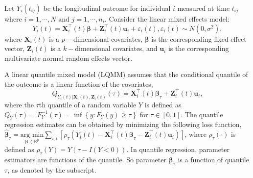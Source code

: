 \documentclass[Crown, sagev, times, doublespace]{sagej}
\begin{document}
Let $Y_{i}(t_{ij})$ be the longitudinal outcome for individual $i$ measured at time $t_{ij}$ where $i=1, \cdots, N\mbox{ and } j=1,\cdots, n_i$. Consider the linear mixed effects model:
\begin{equation}\label{eqn:lmm}
Y_{i}(t) ={\boldsymbol X}_{i}^{\top}(t) \boldsymbol{\beta}+ {\boldsymbol Z}_{i}^{\top}(t)\boldsymbol{u}_i + \varepsilon_{i}(t), \varepsilon_{i}(t)\sim N(0, \sigma^{2}),
\end{equation}
where ${\boldsymbol X}_{i}(t)$ is a $p-$dimensional covariates, $\boldsymbol{\beta}$ is the corresponding fixed effect vector, ${\boldsymbol Z}_{i}(t)$ is a $k-$dimensional covariates, and $\boldsymbol{u}_i$ is the corresponding multivariate normal random effects vector.

A linear quantile mixed model (LQMM) assumes that the conditional quantile of the outcome is a linear function of the covariates,
\begin{equation}\label{eqn:lqmm}
Q_{Y_{i}(t)|{\boldsymbol X}_{i}(t),{\boldsymbol Z}_{i}(t)}(\tau)={\boldsymbol X}_{i}^{\top}(t) \boldsymbol{\beta}_{\tau}+ {\boldsymbol Z}_{i}^{\top}(t)\boldsymbol{u}_i,
\end{equation}
where the $\tau$th quantile of a random variable $Y$ is defined as $Q_{Y}(\tau)=F_{Y}^{-1}(\tau)=\inf\left\{ y:F_{Y}(y)\geq\tau\right\}$ for $\tau\in [0, 1]$. The quantile regression estimates can be obtained by minimizing the following loss function, $\hat{\boldsymbol{\beta}}_{\tau}=\underset{\boldsymbol{\beta}\in \mathbb{R}^{p}}{\mbox{arg min}}\sum_{i, t}\left[\rho_{\tau}\left(Y_{i}(t)-{\boldsymbol X}_{i}^{\top}(t)\boldsymbol{\beta}_{\tau} - {\boldsymbol Z}_{i}^{\top}(t)\boldsymbol{u}_i\right)\right]$, where $\rho_{\tau}(\cdot)$ is defined as $\rho_{\tau}(Y)=Y(\tau-{I}{(Y<0)})$. In quantile regression, parameter estimators are functions of the quantile. So parameter $\boldsymbol{\beta}_{\tau}$ is a function of quantile $\tau$, as denoted by the subscript.
\end{document}

